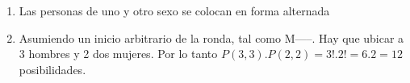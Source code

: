 \documentclass[a4paper]{article}
\newcommand{\answer}{\item[**]}
\begin{document}
\begin{enumerate}
\begin{enumerate} [label=(\alph*)]
		\item Las personas de uno y otro sexo se colocan en forma alternada
		\answer Asumiendo un inicio arbitrario de la ronda, tal como M-----. Hay que ubicar a 3 hombres y 2 dos mujeres. Por lo tanto $P(3,3).P(2,2)=3!.2!=6.2=12$ posibilidades.

	\end{enumerate}

\end{enumerate}
\end{document}
